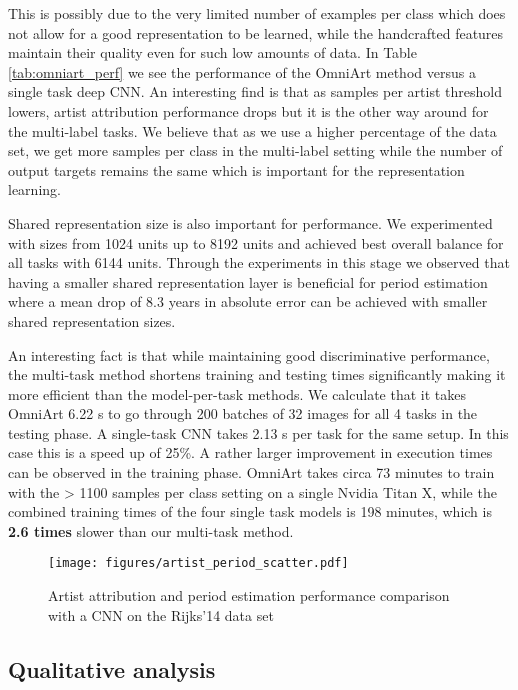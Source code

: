 \documentclass[sigconf]{acmart}
\begin{document}
This is possibly due to the very limited number of examples per class which does not allow for a good representation to be learned, while the handcrafted features maintain their quality even for such low amounts of data. In Table \ref{tab:omniart_perf} we see the performance of the OmniArt method versus a single task deep CNN. An interesting find is that as samples per artist threshold lowers, artist attribution performance drops but it is the other way around for the multi-label tasks. We believe that as we use a higher percentage of the data set, we get more samples per class in the multi-label setting while the number of output targets remains the same which is important for the representation learning. 

Shared representation size is also important for performance. We experimented with sizes from 1024 units up to 8192 units and achieved best overall balance for all tasks with 6144 units. Through the experiments in this stage we observed that having a smaller shared representation layer is beneficial for period estimation where a mean drop of 8.3 years in absolute error can be achieved with smaller shared representation sizes.

An interesting fact is that while maintaining good discriminative performance, the multi-task method shortens training and testing times significantly making it more efficient than the model-per-task methods. We calculate that it takes OmniArt 6.22 s to go through 200 batches of 32 images for all 4 tasks in the testing phase. A single-task CNN takes 2.13 s per task for the same setup. In this case this is a speed up of 25\%. A rather larger improvement in execution times can be observed in the training phase. OmniArt takes circa 73 minutes to train with the > 1100 samples per class setting on a single Nvidia Titan X, while the combined training times of the four single task models is 198 minutes, which is \textbf{2.6 times} slower than our multi-task method.

\begin{figure}

  \texttt{[image: figures/artist\_period\_scatter.pdf]}
  \caption{Artist attribution and period estimation performance comparison with a CNN on the Rijks'14 data set  \label{fig:rijks14_artist}}
\end{figure}\subsection{Qualitative analysis}
\end{document}
